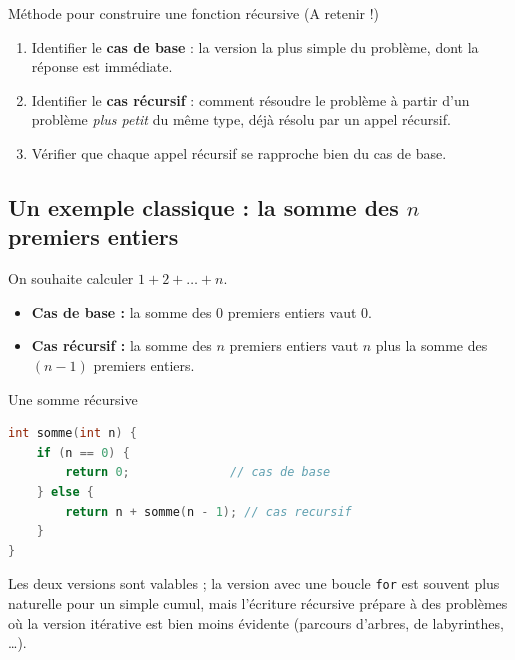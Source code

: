 \begin{UPSTIinfor}{Méthode pour construire une fonction récursive (A retenir !)}
  \begin{enumerate}
    \item Identifier le \textbf{cas de base} : la version la plus simple du problème, dont la réponse est immédiate.
    \item Identifier le \textbf{cas récursif} : comment résoudre le problème à partir d'un problème \emph{plus petit} du même type, déjà résolu par un appel récursif.
    \item Vérifier que chaque appel récursif se rapproche bien du cas de base.
  \end{enumerate}
\end{UPSTIinfor}


\subsection{Un exemple classique : la somme des $n$ premiers entiers}

On souhaite calculer $1 + 2 + \dots{} + n$.

\begin{itemize}
  \item \textbf{Cas de base :} la somme des 0 premiers entiers vaut 0.
  \item \textbf{Cas récursif :} la somme des $n$ premiers entiers vaut $n$ plus la somme des $(n-1)$ premiers entiers.
\end{itemize}

\begin{UPSTIactivite}
\end{UPSTIactivite}

\begin{UPSTIprofOnlyEnv}
\begin{UPSTIcorrectionP}{Une somme récursive}
\begin{lstlisting}[language=c,caption={Correction}]
int somme(int n) {
    if (n == 0) {
        return 0;              // cas de base
    } else {
        return n + somme(n - 1); // cas recursif
    }
}
\end{lstlisting}
Les deux versions sont valables ; la version avec une boucle \texttt{for} est souvent plus naturelle pour un simple cumul, mais l'écriture récursive prépare à des problèmes où la version itérative est bien moins évidente (parcours d'arbres, de labyrinthes, \dots{}).
\end{UPSTIcorrectionP}
\end{UPSTIprofOnlyEnv}


